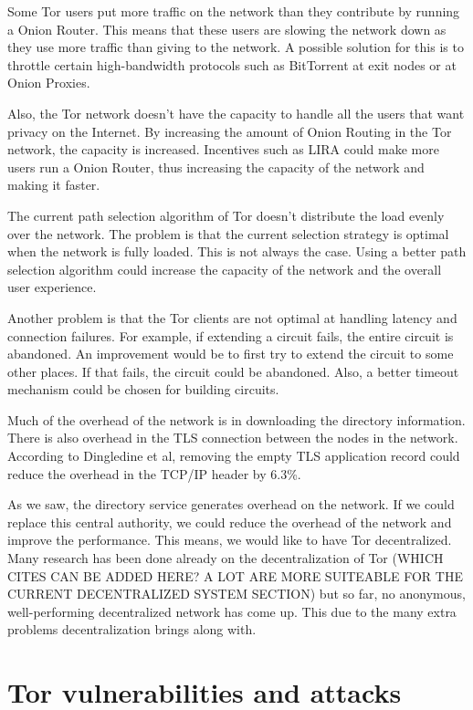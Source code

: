 \documentclass{article}
\begin{document}
		Some Tor users put more traffic on the network than they contribute by running a Onion Router. This means that these users are slowing the network down as they use more traffic than giving to the network. A possible solution for this is to throttle certain high-bandwidth protocols such as BitTorrent at exit nodes or at Onion Proxies.
		
		Also, the Tor network doesn't have the capacity to handle all the users that want privacy on the Internet. By increasing the amount of Onion Routing in the Tor network, the capacity is increased. Incentives such as LIRA \cite{jansen13lira} could make more users run a Onion Router, thus increasing the capacity of the network and making it faster.		
		
		The current path selection algorithm of Tor doesn't distribute the load evenly over the network. The problem is that the current selection strategy is optimal when the network is fully loaded. This is not always the case. Using a better path selection algorithm could increase the capacity of the network and the overall user experience.		
		
		Another problem is that the Tor clients are not optimal at handling latency and connection failures. For example, if extending a circuit fails, the entire circuit is abandoned. An improvement would be to first try to extend the circuit to some other places. If that fails, the circuit could be abandoned. Also, a better timeout mechanism could be chosen for building circuits.		
		
		Much of the overhead of the network is in downloading the directory information. There is also overhead in the TLS connection between the nodes in the network. According to Dingledine et al, removing the empty TLS application record could reduce the overhead in the TCP/IP header by 6.3\%.
		
		As we saw, the directory service generates overhead on the network. If we could replace this central authority, we could reduce the overhead of the network and improve the performance. This means, we would like to have Tor decentralized. Many research has been done already on the decentralization of Tor \cite{wang2012octopus, alsabah2013pctcp} (WHICH CITES CAN BE ADDED HERE? A LOT ARE MORE SUITEABLE FOR THE CURRENT DECENTRALIZED SYSTEM SECTION) but so far, no anonymous, well-performing decentralized network has come up. This due to the many extra problems decentralization brings along with.
		
\section{Tor vulnerabilities and attacks}
	\label{sec:attacks}
	
\end{document}
